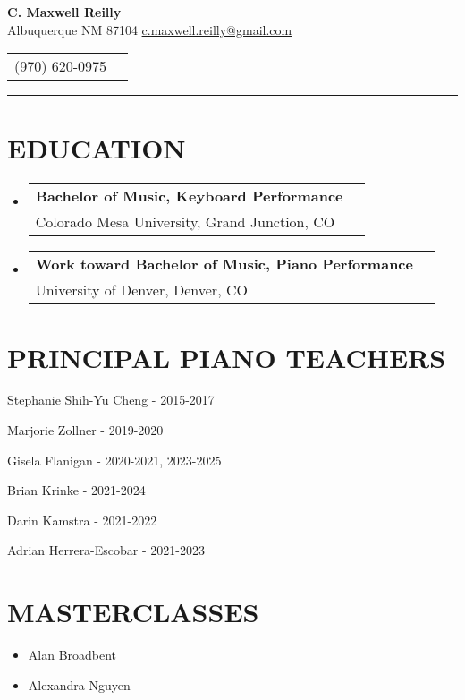 \documentclass{article}
\makeatletter
\newcommand{\cvItem}[1]{
        \item {
            {#1}
        }
    }
\newcommand{\cvSubHeadingListStart}{\begin{itemize}[leftmargin=0pt]}
\newcommand{\cvSubHeadingListEnd}{\end{itemize}}
\newcommand{\cvItemListStart}{\begin{itemize}[leftmargin=10pt]}
\newcommand{\cvItemListEnd}{\end{itemize}}
\newcommand{\cvEducationSubheading}[2]{
        \vspace{-1pt}\item[]
            \begin{tabular*}{1\textwidth}[t]{l@{\extracolsep{\fill}}r}
                \textbf{#1} \\
                {#2} \\
            \end{tabular*}
    }
\makeatother
\begin{document}
    \begin{center}
        \textbf{\Large C. Maxwell Reilly} \\ Albuquerque NM 87104
        \href{mailto:c.maxwell.reilly@gmail.com}{c.maxwell.reilly@gmail.com}
    \end{center}\vspace{-11pt}
    \begin{center}
        \begin{tabular}{c c}
            (970) 620-0975 \\
        \end{tabular}\vspace{-8pt}
    \end{center}
    \rule{\textwidth}{1pt}

    \section{EDUCATION}
        \cvSubHeadingListStart
            \cvEducationSubheading
                {Bachelor of Music, Keyboard Performance}
                {Colorado Mesa University, Grand Junction, CO}
            \cvEducationSubheading
                {Work toward Bachelor of Music, Piano Performance}
                {University of Denver, Denver, CO}
        \cvSubHeadingListEnd

    \section{PRINCIPAL PIANO TEACHERS}
        \cvItemListStart
            \begin{multicols}{2}
                \cvItem{Stephanie Shih-Yu Cheng - 2015-2017}
                \cvItem{Marjorie Zollner - 2019-2020}
                \cvItem{Gisela Flanigan - 2020-2021, 2023-2025} 
                \cvItem{Brian Krinke - 2021-2024}
                \cvItem{Darin Kamstra - 2021-2022}
                \cvItem{Adrian Herrera-Escobar - 2021-2023}
            \end{multicols}
        \cvItemListEnd

    \section{MASTERCLASSES}
        \cvItemListStart
            \cvItem{Alan Broadbent}
            \cvItem{Alexandra Nguyen}
        \cvItemListEnd
\end{document}
